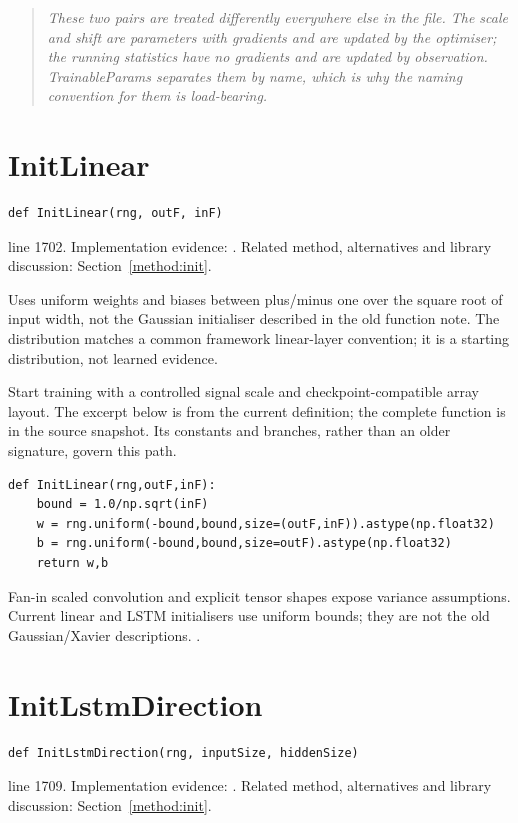 \begin{quote}\small\itshape These two pairs are treated differently everywhere else in the file. The scale and shift are parameters with gradients and are updated by the optimiser; the running statistics have no gradients and are updated by observation. TrainableParams separates them by name, which is why the naming convention for them is load-bearing.\end{quote}


\section{InitLinear}\label{fn:train:InitLinear}
\begin{lstlisting}[style=sig]
def InitLinear(rng, outF, inF)
\end{lstlisting}
 line 1702. Implementation evidence: \cite{code2026}. Related method, alternatives and library discussion: Section~\ref{method:init}.


Uses uniform weights and biases between plus/minus one over the square root of input width, not the Gaussian initialiser described in the old function note. The distribution matches a common framework linear-layer convention; it is a starting distribution, not learned evidence.


Start training with a controlled signal scale and checkpoint-compatible array layout. The excerpt below is from the current definition; the complete function is in the source snapshot. Its constants and branches, rather than an older signature, govern this path.


\begin{lstlisting}[style=plain]
def InitLinear(rng,outF,inF):
    bound = 1.0/np.sqrt(inF)
    w = rng.uniform(-bound,bound,size=(outF,inF)).astype(np.float32)
    b = rng.uniform(-bound,bound,size=outF).astype(np.float32)
    return w,b
\end{lstlisting}
Fan-in scaled convolution and explicit tensor shapes expose variance assumptions. Current linear and LSTM initialisers use uniform bounds; they are not the old Gaussian/Xavier descriptions. \cite{he2015,glorot2010,torchlstm,torchlinear}.


\section{InitLstmDirection}\label{fn:train:InitLstmDirection}
\begin{lstlisting}[style=sig]
def InitLstmDirection(rng, inputSize, hiddenSize)
\end{lstlisting}
 line 1709. Implementation evidence: \cite{code2026}. Related method, alternatives and library discussion: Section~\ref{method:init}.


